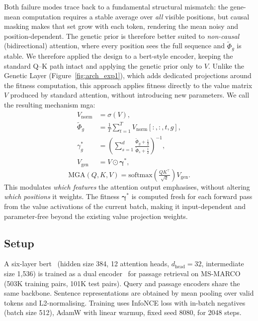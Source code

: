 \documentclass[10pt, a4paper, twocolumn]{article}
\begin{document}
Both failure modes trace back to a fundamental structural mismatch: the gene-mean computation requires a stable average over \emph{all} visible positions, but causal masking makes that set grow with each token, rendering the mean noisy and position-dependent. The genetic prior is therefore better suited to \emph{non-causal} (bidirectional) attention, where every position sees the full sequence and $\tilde{\Phi}_g$ is stable. We therefore applied the design to a \acs{bert}-style encoder, keeping the standard Q--K path intact and applying the genetic prior only to $V$. Unlike the Genetic Layer (Figure~\ref{fig:arch_exp1}), which adds dedicated projections around the fitness computation, this approach applies fitness directly to the value matrix $V$ produced by standard attention, without introducing new parameters. We call the resulting mechanism \ac{mga}:
%
\begin{align}
  V_\mathrm{norm} &= \sigma(V), \\[2pt]
  \tilde{\Phi}_g  &= \frac{1}{T}\sum_{t=1}^{T}
                     V_\mathrm{norm}[:, :, t, g], \\[2pt]
  \gamma_g^*      &= \left(\sum_{s=1}^{d}
                     \frac{\tilde{\Phi}_g + \tfrac{1}{2}}
                          {\tilde{\Phi}_s + \tfrac{1}{2}}\right)^{-1}\!\!, \\[2pt]
  V_\mathrm{gen}  &= V \odot \boldsymbol{\gamma}^*,
\end{align}
%
\begin{equation}
  \mathrm{MGA}(Q,K,V)
    = \mathrm{softmax}\!\left(\tfrac{QK^\top}{\sqrt{d}}\right)V_\mathrm{gen}.
  \label{eq:mga}
\end{equation}
%
This modulates \emph{which features} the attention output emphasises, without altering \emph{which positions} it weights. The fitness $\boldsymbol{\gamma}^*$ is computed fresh for each forward pass from the value activations of the current batch, making it input-dependent and parameter-free beyond the existing value projection weights.

\subsection*{Setup}

A six-layer \acs{bert}~\cite{devlin2019bert} (hidden size 384, 12 attention heads, $d_\mathrm{head}=32$, intermediate size 1,536) is trained as a dual encoder~\cite{karpukhin2020dpr} for passage retrieval on MS-MARCO~\cite{bajaj2016msmarco} (503K training pairs, 101K test pairs). Query and passage encoders share the same backbone. Sentence representations are obtained by mean pooling over valid tokens and L2-normalising. Training uses InfoNCE loss with in-batch negatives (batch size 512), AdamW with linear warmup, fixed seed 8080, for 2048 steps.
\end{document}
